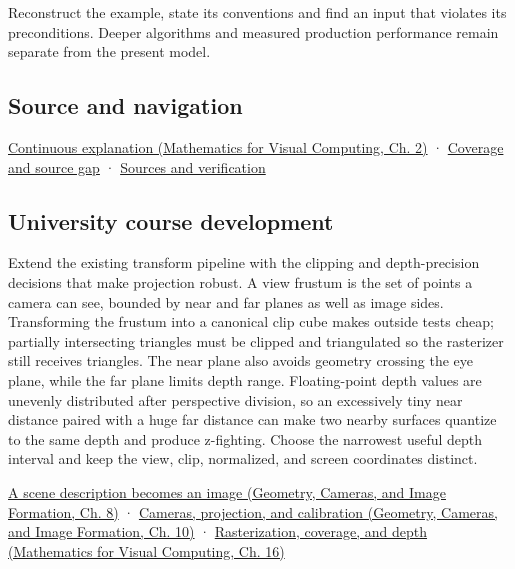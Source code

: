 \hypertarget{appendix-1c07d64f5e70-recall-and-next-depth}{}

Reconstruct the example, state its conventions and find an input that violates its preconditions. Deeper algorithms and measured production performance remain separate from the present model.

\subsection{Source and navigation}\label{appendix-1c07d64f5e70-source-and-navigation}

\hypertarget{appendix-1c07d64f5e70-source-and-navigation}{}

\href{../02-Mathematics-for-Visual-Computing/main.pdf\#nameddest=01-foundations-i-ch018-keep-the-promises-visible-while-moving-between-representations}{Continuous explanation (Mathematics for Visual Computing, Ch. 2)} · \hyperref[appendix-fd090d982a15-phase-7---parts-601-700]{Coverage and source gap} · \hyperref[appendix-a103e7846d21-phase-7---source-analysis-and-verification]{Sources and verification}

\subsection{University course development}\label{appendix-1c07d64f5e70-university-course-development}

\hypertarget{appendix-1c07d64f5e70-university-course-development}{}

Extend the existing transform pipeline with the clipping and depth-precision decisions that make projection robust. A view frustum is the set of points a camera can see, bounded by near and far planes as well as image sides. Transforming the frustum into a canonical clip cube makes outside tests cheap; partially intersecting triangles must be clipped and triangulated so the rasterizer still receives triangles. The near plane also avoids geometry crossing the eye plane, while the far plane limits depth range. Floating-point depth values are unevenly distributed after perspective division, so an excessively tiny near distance paired with a huge far distance can make two nearby surfaces quantize to the same depth and produce z-fighting. Choose the narrowest useful depth interval and keep the view, clip, normalized, and screen coordinates distinct.

\href{../03-Geometry-Cameras-and-Image-Formation/main.pdf\#nameddest=03-visual-computing-i-ch001-a-scene-description-becomes-an-image}{A scene description becomes an image (Geometry, Cameras, and Image Formation, Ch. 8)} · \href{../03-Geometry-Cameras-and-Image-Formation/main.pdf\#nameddest=03-visual-computing-i-ch003-cameras-projection-and-calibration}{Cameras, projection, and calibration (Geometry, Cameras, and Image Formation, Ch. 10)} · \href{../02-Mathematics-for-Visual-Computing/main.pdf\#nameddest=03-visual-computing-i-ch012-rasterization-coverage-and-depth}{Rasterization, coverage, and depth (Mathematics for Visual Computing, Ch. 16)}

